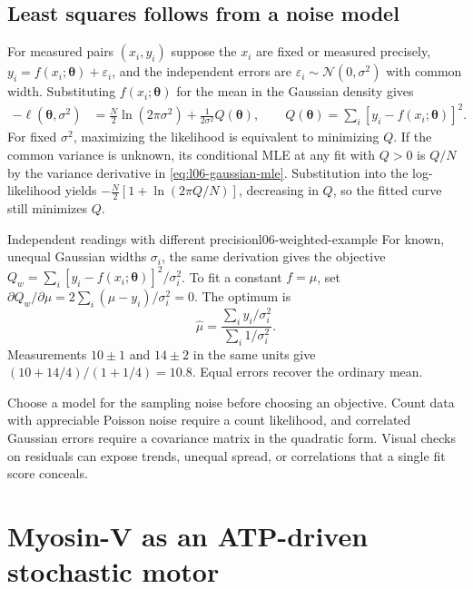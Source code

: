\subsection{Least squares follows from a noise model}
\label{subsec:l06-least-squares}

For measured pairs $(x_i,y_i)$ suppose the $x_i$ are fixed or measured precisely, $y_i=f(x_i;\boldsymbol\theta)+\varepsilon_i$, and the independent errors are $\varepsilon_i\sim\mathcal N(0,\sigma^2)$ with common width. Substituting $f(x_i;\boldsymbol\theta)$ for the mean in the Gaussian density gives
\begin{align}
 -\ell(\boldsymbol\theta,\sigma^2)
 &=\frac{N}{2}\ln(2\pi\sigma^2)
   +\frac{1}{2\sigma^2}Q(\boldsymbol\theta),\qquad
 Q(\boldsymbol\theta)=\sum_i[y_i-f(x_i;\boldsymbol\theta)]^2.
 \label{eq:l06-least-squares}
\end{align}
For fixed $\sigma^2$, maximizing the likelihood is equivalent to minimizing $Q$. If the common variance is unknown, its conditional MLE at any fit with $Q>0$ is $Q/N$ by the variance derivative in \eqref{eq:l06-gaussian-mle}. Substitution into the log-likelihood yields $-\tfrac{N}{2}[1+\ln(2\pi Q/N)]$, decreasing in $Q$, so the fitted curve still minimizes $Q$.

\begin{example}{Independent readings with different precision}{l06-weighted-example}
For known, unequal Gaussian widths $\sigma_i$, the same derivation gives the objective $Q_w=\sum_i[y_i-f(x_i;\boldsymbol\theta)]^2/\sigma_i^2$. To fit a constant $f=\mu$, set $\partial Q_w/\partial\mu=2\sum_i(\mu-y_i)/\sigma_i^2=0$. The optimum is
\begin{equation}
 \widehat\mu=\frac{\sum_i y_i/\sigma_i^2}{\sum_i1/\sigma_i^2}.
 \label{eq:l06-weighted-mean}
\end{equation}
Measurements $10\pm1$ and $14\pm2$ in the same units give $(10+14/4)/(1+1/4)=10.8$. Equal errors recover the ordinary mean.
\end{example}

Choose a model for the sampling noise before choosing an objective. Count data with appreciable Poisson noise require a count likelihood, and correlated Gaussian errors require a covariance matrix in the quadratic form. Visual checks on residuals can expose trends, unequal spread, or correlations that a single fit score conceals.

\section{Myosin-V as an ATP-driven stochastic motor}
\label{sec:l06-myosin}

